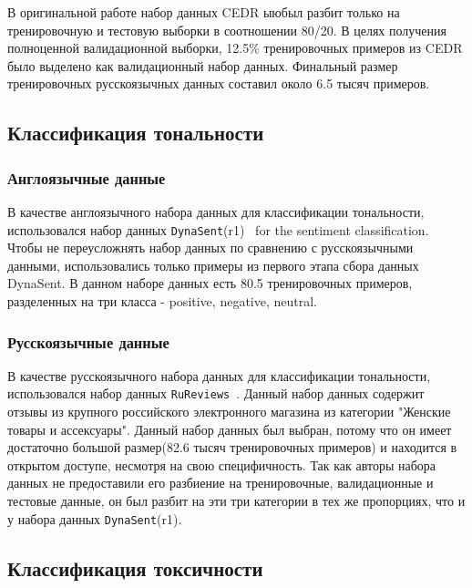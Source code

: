 В оригинальной работе набор данных CEDR ыюбыл разбит только на тренировочную и тестовую выборки в соотношении 80/20. В целях получения полноценной валидационной выборки, 12.5\% тренировочных примеров из CEDR было выделено как валидационный набор данных. Финальный размер тренировочных русскоязычных данных составил около 6.5 тысяч примеров.


\subsection{Классификация тональности}

\subsubsection{Англоязычные данные} 
В качестве англоязычного набора данных для классификации тональности, использовался набор данных \texttt{DynaSent}(r1)~\cite{sentiment} for the sentiment classification. Чтобы не переусложнять набор данных по сравнению с русскоязычными данными, использовались только примеры из первого этапа сбора данных DynaSent. В данном наборе данных есть 80.5 тренировочных примеров, разделенных на три класса - positive, negative, neutral. 

\subsubsection{Русскоязычные данные} 
В качестве русскоязычного набора данных для классификации тональности, использовался набор данных \texttt{RuReviews}~\cite{ru_sentiment}. Данный набор данных содержит отзывы из крупного российского электронного магазина из категории "Женские товары и ассексуары". Данный набор данных был выбран, потому что он имеет достаточно большой размер(82.6 тысяч тренировочных примеров) и находится в открытом доступе, несмотря на свою специфичность. Так как авторы набора данных не предоставили его разбиение на тренировочные, валидационные и тестовые данные, он был разбит на эти три категории в тех же пропорциях, что и у набора данных
 \texttt{DynaSent}(r1). 

\subsection{Классификация токсичности}
